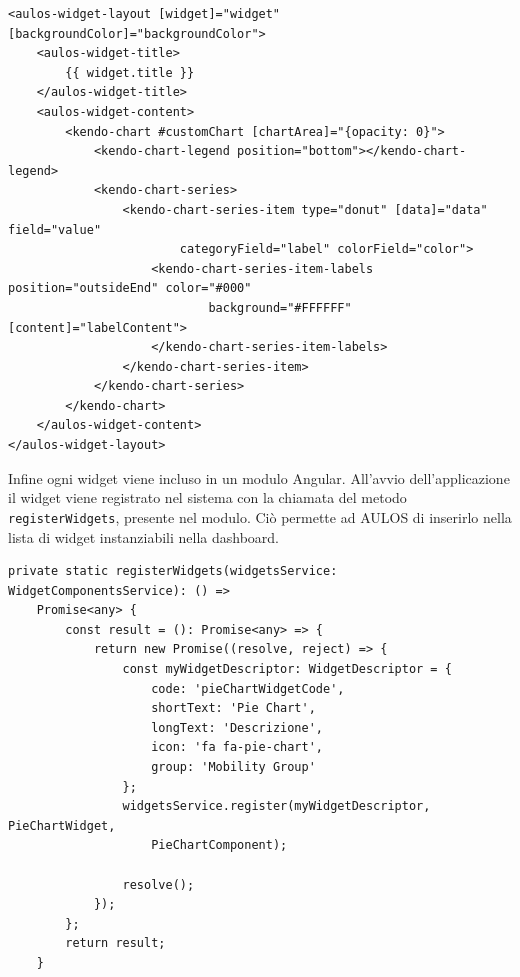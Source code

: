 \begin{lstlisting}[caption={File pie-chart.component.html}, style=javaScriptCode]
<aulos-widget-layout [widget]="widget" [backgroundColor]="backgroundColor">
    <aulos-widget-title>
        {{ widget.title }}
    </aulos-widget-title>
    <aulos-widget-content>
        <kendo-chart #customChart [chartArea]="{opacity: 0}">
            <kendo-chart-legend position="bottom"></kendo-chart-legend>
            <kendo-chart-series>
                <kendo-chart-series-item type="donut" [data]="data" field="value" 
                        categoryField="label" colorField="color">
                    <kendo-chart-series-item-labels position="outsideEnd" color="#000" 
                            background="#FFFFFF" [content]="labelContent">
                    </kendo-chart-series-item-labels>
                </kendo-chart-series-item>
            </kendo-chart-series>
        </kendo-chart>
    </aulos-widget-content>
</aulos-widget-layout>
\end{lstlisting}
Infine ogni widget viene incluso in un modulo Angular. All'avvio dell'applicazione il widget viene registrato nel sistema con la chiamata del metodo \verb|registerWidgets|, presente nel modulo. Ciò permette ad AULOS di inserirlo nella lista di widget instanziabili nella dashboard.

\begin{lstlisting}[caption={Metodo all'interno del modulo che registra il widget nel sistema}, style=javaScriptCode]
private static registerWidgets(widgetsService: WidgetComponentsService): () => 
    Promise<any> {
        const result = (): Promise<any> => {
            return new Promise((resolve, reject) => {
                const myWidgetDescriptor: WidgetDescriptor = {
                    code: 'pieChartWidgetCode',
                    shortText: 'Pie Chart',
                    longText: 'Descrizione',
                    icon: 'fa fa-pie-chart',
                    group: 'Mobility Group'
                };
                widgetsService.register(myWidgetDescriptor, PieChartWidget, 
                    PieChartComponent);

                resolve();
            });
        };
        return result;
    }
\end{lstlisting}

